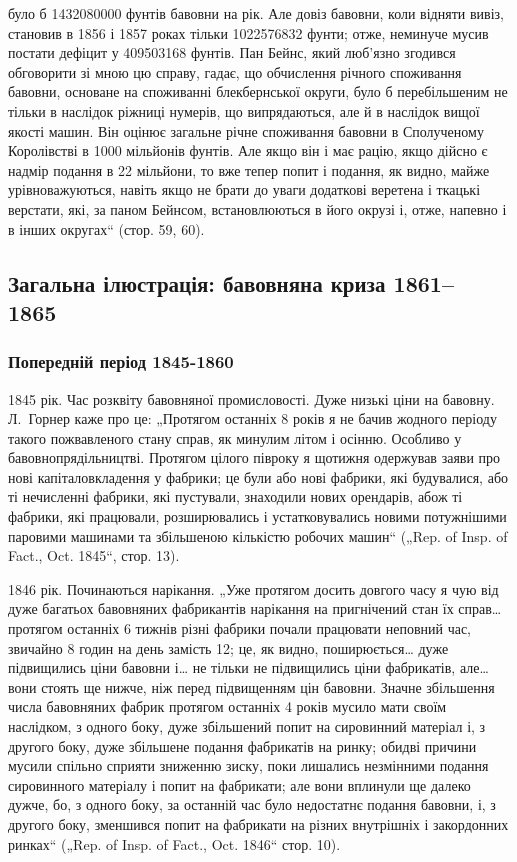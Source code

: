 \parcont{}  %
було б \num{1432080000} фунтів бавовни на рік. Але довіз бавовни,
коли відняти вивіз, становив в 1856 і 1857 роках тільки
\num{1022576832} фунти; отже, неминуче мусив постати дефіцит
у \num{409503168} фунтів. Пан Бейнс, який люб’язно згодився обговорити
зі мною цю справу, гадає, що обчислення річного споживання
бавовни, основане на споживанні блекбернської округи,
було б перебільшеним не тільки в наслідок ріжниці нумерів, що
випрядаються, але й в наслідок вищої якості машин. Він оцінює загальне
річне споживання бавовни в Сполученому Королівстві в
1000 мільйонів фунтів. Але якщо він і має рацію, якщо дійсно
є надмір подання в 22  мільйони, то вже тепер попит і подання,
як видно, майже урівноважуються, навіть якщо не брати до
уваги додаткові веретена і ткацькі верстати, які, за паном
Бейнсом, встановлюються в його окрузі і, отже, напевно і
в інших округах“ (стор. 59, 60).

\subsection{Загальна ілюстрація: бавовняна криза 1861--1865~}

\subsubsection{Попередній період 1845-1860~}

1845 рік. Час розквіту бавовняної промисловості. Дуже низькі
ціни на бавовну. Л.~Горнер каже про це: „Протягом останніх
8 років я не бачив жодного періоду такого пожвавленого стану
справ, як минулим літом і осінню. Особливо у бавовнопрядільництві.
Протягом цілого півроку я щотижня одержував заяви
про нові капіталовкладення у фабрики; це були або нові фабрики,
які будувалися, або ті нечисленні фабрики, які пустували, знаходили
нових орендарів, абож ті фабрики, які працювали, розширювались
і устатковувались новими потужнішими паровими машинами
та збільшеною кількістю робочих машин“ („Rep. of Insp.
of Fact., Oct. 1845“, стор. 13).

1846 рік. Починаються нарікання. „Уже протягом досить довгого
часу я чую від дуже багатьох бавовняних фабрикантів нарікання
на пригнічений стан їх справ\dots{} протягом останніх 6 тижнів
різні фабрики почали працювати неповний час, звичайно
8 годин на день замість 12; це, як видно, поширюється\dots{} дуже
підвищились ціни бавовни і\dots{} не тільки не підвищились ціни
фабрикатів, але\dots{} вони стоять ще нижче, ніж перед підвищенням
цін бавовни. Значне збільшення числа бавовняних фабрик
протягом останніх 4 років мусило мати своїм наслідком,
з одного боку, дуже збільшений попит на сировинний матеріал
і, з другого боку, дуже збільшене подання фабрикатів на ринку;
обидві причини мусили спільно сприяти зниженню зиску, поки
лишались незмінними подання сировинного матеріалу і попит
на фабрикати; але вони вплинули ще далеко дужче, бо, з одного
боку, за останній час було недостатнє подання бавовни,
і, з другого боку, зменшився попит на фабрикати на різних
внутрішніх і закордонних ринках“ („Rep. of Insp. of Fact., Oct.
1846“ стор. 10).
